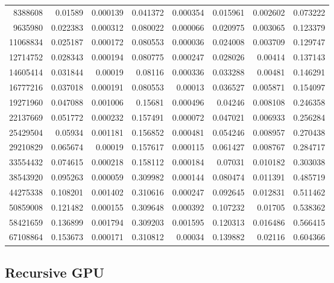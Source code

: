 \begin{longtable}{r r r r r r r r}
8388608 & 0.01589 & 0.000139 & 0.041372 & 0.000354 & 0.015961 & 0.002602 & 0.073222 \\
9635980 & 0.022383 & 0.000312 & 0.080022 & 0.000066 & 0.020975 & 0.003065 & 0.123379 \\
11068834 & 0.025187 & 0.000172 & 0.080553 & 0.000036 & 0.024008 & 0.003709 & 0.129747 \\
12714752 & 0.028343 & 0.000194 & 0.080775 & 0.000247 & 0.028026 & 0.00414 & 0.137143 \\
14605414 & 0.031844 & 0.00019 & 0.08116 & 0.000336 & 0.033288 & 0.00481 & 0.146291 \\
16777216 & 0.037018 & 0.000191 & 0.080553 & 0.00013 & 0.036527 & 0.005871 & 0.154097 \\
19271960 & 0.047088 & 0.001006 & 0.15681 & 0.000496 & 0.04246 & 0.008108 & 0.246358 \\
22137669 & 0.051772 & 0.000232 & 0.157491 & 0.000072 & 0.047021 & 0.006933 & 0.256284 \\
25429504 & 0.05934 & 0.001181 & 0.156852 & 0.000481 & 0.054246 & 0.008957 & 0.270438 \\
29210829 & 0.065674 & 0.00019 & 0.157617 & 0.000115 & 0.061427 & 0.008767 & 0.284717 \\
33554432 & 0.074615 & 0.000218 & 0.158112 & 0.000184 & 0.07031 & 0.010182 & 0.303038 \\
38543920 & 0.095263 & 0.000059 & 0.309982 & 0.000144 & 0.080474 & 0.011391 & 0.485719 \\
44275338 & 0.108201 & 0.001402 & 0.310616 & 0.000247 & 0.092645 & 0.012831 & 0.511462 \\
50859008 & 0.121482 & 0.000155 & 0.309648 & 0.000392 & 0.107232 & 0.01705 & 0.538362 \\
58421659 & 0.136899 & 0.001794 & 0.309203 & 0.001595 & 0.120313 & 0.016486 & 0.566415 \\
67108864 & 0.153673 & 0.000171 & 0.310812 & 0.00034 & 0.139882 & 0.02116 & 0.604366 \\
\end{longtable}

\subsection*{Recursive GPU}

